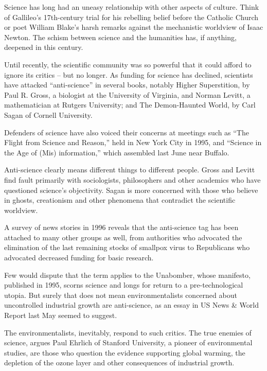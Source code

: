 \documentclass[a4paper]{article}
\begin{document}
\par
Science has long had an uneasy relationship with other aspects of culture. Think of Gallileo’s 17th-century trial for his rebelling belief before the Catholic Church or poet William Blake’s harsh remarks against the mechanistic worldview of Isaac Newton. The schism between science and the humanities has, if anything, deepened in this century.

\par
Until recently, the scientific community was so powerful that it could afford to ignore its critics -- but no longer. As funding for science has declined, scientists have attacked “anti-science” in several books, notably Higher Superstition, by Paul R. Gross, a biologist at the University of Virginia, and Norman Levitt, a mathematician at Rutgers University; and The Demon-Haunted World, by Carl Sagan of Cornell University.

\par
Defenders of science have also voiced their concerns at meetings such as “The Flight from Science and Reason,” held in New York City in 1995, and “Science in the Age of (Mis) information,” which assembled last June near Buffalo.

\par
Anti-science clearly means different things to different people. Gross and Levitt find fault primarily with sociologists, philosophers and other academics who have questioned science’s objectivity. Sagan is more concerned with those who believe in ghosts, creationism and other phenomena that contradict the scientific worldview.

\par
A survey of news stories in 1996 reveals that the anti-science tag has been attached to many other groups as well, from authorities who advocated the elimination of the last remaining stocks of smallpox virus to Republicans who advocated decreased funding for basic research.

\par
Few would dispute that the term applies to the Unabomber, whose manifesto, published in 1995, scorns science and longs for return to a pre-technological utopia. But surely that does not mean environmentalists concerned about uncontrolled industrial growth are anti-science, as an essay in US News \& World Report last May seemed to suggest.

\par
The environmentalists, inevitably, respond to such critics. The true enemies of science, argues Paul Ehrlich of Stanford University, a pioneer of environmental studies, are those who question the evidence supporting global warming, the depletion of the ozone layer and other consequences of industrial growth.
\end{document}
